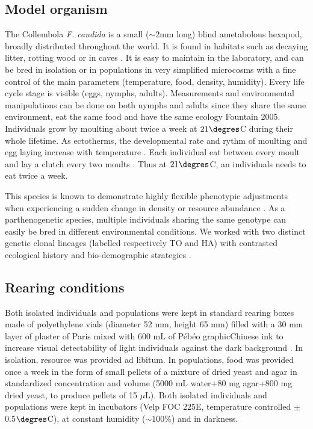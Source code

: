 \subsection{Model organism}

The Collembola \textit{F. candida} is a small ($\sim 2$mm long) blind
ametabolous hexapod, broadly distributed throughout the world. It is found in habitats such
as decaying litter, rotting wood or in caves \autocites{fountain2005a}. It
is easy to maintain in the laboratory, and can be bred in isolation or in populations in
very simplified microcosms with a fine control of the main parameters
(temperature, food, density, humidity). Every life cycle stage is visible (eggs,
nymphs, adults). Measurements and environmental manipulations can be done on
both nymphs and adults since they share the same environment, eat the same food
and have the same ecology {Fountain 2005}. Individuals grow by moulting about
twice a week at $21\degres$C during their whole lifetime. As ectotherms, the
developmental rate and rythm of moulting and egg laying increase with
temperature \autocites{cutkomp1986chronobiologic}. Each individual eat between every
moult and lay a clutch every two moults \autocites{palevody1974a}. Thus
at $21\degres$C, an individuals needs to eat twice a week.

This species is known to demonstrate highly flexible phenotypic adjustments when
experiencing a sudden change in density or resource abundance \autocites{tully2008a}.
As a parthenogenetic species, multiple individuals sharing the same genotype can
easily be bred in different environmental conditions. We worked with two
distinct genetic clonal lineages (labelled respectively TO and HA) with
contrasted ecological history and bio-demographic strategies
\autocites{tully2006a,tully2008a}.

\subsection{Rearing conditions}

Both isolated individuals and populations were kept in standard rearing boxes
made of polyethylene vials (diameter 52 mm, height 65 mm) filled with a 30 mm
layer of plaster of Paris mixed with 600 mL of Pébéo graphic\circledR Chinese
ink to increase visual detectability of light individuals against the dark
background \autocites{tully2008a}. In isolation, resource was provided ad
libitum. In populations, food was provided once a week in the form of small
pellets of a mixture of dried yeast and agar in standardized concentration and
volume (5000 mL water+80 mg agar+800 mg dried yeast, to produce pellets of 15
$\mu$L). Both isolated individuals and populations were kept in incubators (Velp
FOC 225E, temperature controlled $\pm$0.5$\degres$C), at constant humidity ($\sim
100\%$) and in darkness.

